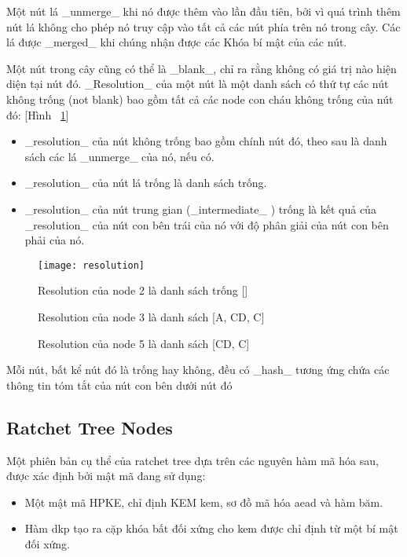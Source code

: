 \documentclass[../main-report.tex]{subfiles}
\begin{document}
Một nút lá \_unmerge\_ khi nó được thêm vào lần đầu tiên, bởi vì quá trình thêm nút lá không cho phép nó truy cập vào tất cả các nút phía trên nó trong cây. Các lá được \_merged\_ khi chúng nhận được các Khóa bí mật của các nút.

Một nút trong cây cũng có thể là \_blank\_, chỉ ra rằng không có giá trị nào hiện diện tại nút đó. \_Resolution\_ của một nút là một danh sách có thứ tự các nút không trống (not blank) bao gồm tất cả các node con cháu không trống của nút đó: [Hình ~\ref{fig:resolution}]

\begin{itemize}
\item{\_resolution\_ của nút không trống bao gồm chính nút đó, theo sau là danh sách các lá \_unmerge\_ của nó, nếu có.}\item{\_resolution\_ của nút lá trống là danh sách trống.}
\item{\_resolution\_ của nút trung gian (\_intermediate\_ ) trống là kết quả của \_resolution\_ của nút con bên trái của
nó với độ phân giải của nút con bên phải của nó.}
\end{itemize} 

\begin{figure}[!h]
\begin{center}
\label{fig:resolution}
\texttt{[image: resolution]}
\caption{Resolution của node 5 là danh sách [CD, C]}

{Resolution của node 2 là danh sách trống []}

{Resolution của node 3 là danh sách [A, CD, C]}
\end{center}
\end{figure}

Mỗi nút, bất kể nút đó là trống hay không, đều có \_hash\_ tương ứng chứa các thông tin tóm tắt của nút con bên dưới nút đó


\subsection{Ratchet Tree Nodes}
Một phiên bản cụ thể của ratchet tree dựa trên các nguyên hàm mã hóa sau, được xác định bởi mật mã đang sử dụng:

\begin{itemize}
\item{Một mật mã HPKE, chỉ định \glsdesc{KEM} \acrfull{kem}, sơ đồ mã hóa \acrshort{aead} và hàm băm.}
\item{Hàm \acrfull{dkp} tạo ra cặp khóa bất đối xứng cho \acrshort{kem} được chỉ định từ một bí mật đối xứng.}
\end{itemize} 
\end{document}
